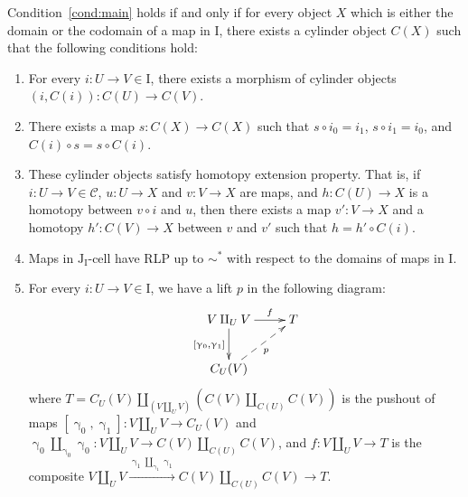 \documentclass{tac}
\theoremstyle{definition}
\newcommand{\cof}{\mathcal{C}}
\newcommand{\I}{\mathrm{I}}
\newcommand{\J}{\mathrm{J}}
\newcommand{\class}[2]{#1\text{-}\mathrm{#2}}
\newcommand{\Icell}[1][\I]{\class{#1}{cell}}
\newcommand{\Jcell}[1][]{\Icell[\J#1]}
\newcommand{\cyli}{\upgamma}
\begin{document}
\begin{prop}
Condition~\eqref{cond:main} holds if and only if for every object $X$ which is either the domain or the codomain of a map in $\I$,
there exists a cylinder object $C(X)$ such that the following conditions hold:
\begin{enumerate}
\item For every $i : U \to V \in \I$, there exists a morphism of cylinder objects $(i,C(i)) : C(U) \to C(V)$.
\item There exists a map $s : C(X) \to C(X)$ such that $s \circ i_0 = i_1$, $s \circ i_1 = i_0$, and $C(i) \circ s = s \circ C(i)$.
\item These cylinder objects satisfy homotopy extension property. That is,
if $i : U \to V \in \cof$, $u : U \to X$ and $v : V \to X$ are maps, and $h : C(U) \to X$ is a homotopy between $v \circ i$ and $u$,
then there exists a map $v' : V \to X$ and a homotopy $h' : C(V) \to X$ between $v$ and $v'$ such that $h = h' \circ C(i)$.
\item Maps in $\Jcell[_\I]$ have RLP up to $\sim^*$ with respect to the domains of maps in $\I$.
\item For every $i : U \to V \in \I$, we have a lift $p$ in the following diagram:
\[ \xymatrix{ V \amalg_U V \ar[r]^-f \ar[d]_{[\cyli_0,\cyli_1]} & T \\
              C_U(V) \ar@{-->}[ur]_p
            } \]
where $T = C_U(V) \amalg_{(V \amalg_U V)} (C(V) \amalg_{C(U)} C(V))$ is the pushout of maps $[\cyli_0,\cyli_1] : V \amalg_U V \to C_U(V)$
and $\cyli_0 \amalg_{\cyli_0} \cyli_0 : V \amalg_U V \to C(V) \amalg_{C(U)} C(V)$,
and $f : V \amalg_U V \to T$ is the composite $V \amalg_U V \xrightarrow{\cyli_1 \amalg_{\cyli_1} \cyli_1} C(V) \amalg_{C(U)} C(V) \to T$.
\end{enumerate}
\end{prop}
\end{document}
